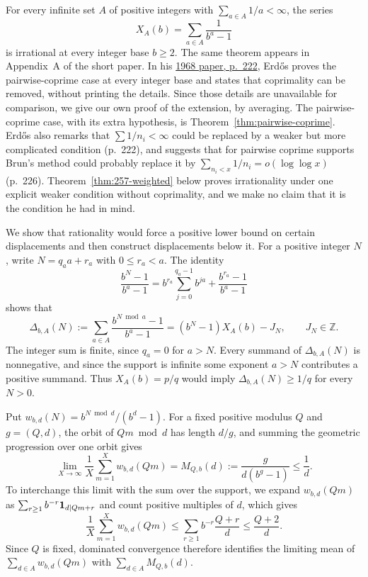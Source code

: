 For every infinite set $A$ of positive integers with
$\sum_{a\in A}1/a<\infty$, the series
\[
 X_A(b)=\sum_{a\in A}\frac1{b^a-1}
\]
is irrational at every integer base $b\ge2$. The same theorem appears
in Appendix~A of the short paper. In his
\href{https://users.renyi.hu/~p_erdos/1969-09.pdf}{1968 paper, p.~222},
Erd\H{o}s proves the pairwise-coprime case at every integer base and
states that coprimality can be removed, without printing the details.
Since those details are unavailable for comparison, we give our own
proof of the extension, by averaging. The pairwise-coprime case, with
its extra hypothesis, is Theorem~\ref{thm:pairwise-coprime}. Erd\H{o}s
also remarks that $\sum1/n_i<\infty$ could be replaced by a weaker but more
complicated condition (p.~222), and suggests that for pairwise coprime
supports Brun's method could probably replace it by
$\sum_{n_i<x}1/n_i=o(\log\log x)$ (p.~226).
Theorem~\ref{thm:257-weighted} below proves irrationality under one explicit
weaker condition without coprimality, and we make no claim that it is the
condition he had in mind.

We show that rationality would force a positive lower bound on certain
displacements and then construct displacements below it. For a positive
integer $N$, write $N=q_a a+r_a$ with $0\le r_a<a$. The identity
\[
 \frac{b^N-1}{b^a-1}
 =b^{r_a}\sum_{j=0}^{q_a-1}b^{ja}
  +\frac{b^{r_a}-1}{b^a-1}
\]
shows that
\[
 \Delta_{b,A}(N):=\sum_{a\in A}\frac{b^{N\bmod a}-1}{b^a-1}
 =(b^N-1)X_A(b)-J_N,\qquad J_N\in\mathbb Z.
\]
The integer sum is finite, since $q_a=0$ for $a>N$. Every summand of
$\Delta_{b,A}(N)$ is nonnegative, and since the support is infinite some
exponent $a>N$ contributes a positive summand.
Thus $X_A(b)=p/q$ would imply $\Delta_{b,A}(N)\ge1/q$ for every $N>0$.

Put $w_{b,d}(N)=b^{N\bmod d}/(b^d-1)$. For a fixed positive modulus $Q$
and $g=(Q,d)$, the orbit of $Qm\bmod d$ has length $d/g$, and summing the
geometric progression over one orbit gives
\[
 \lim_{X\to\infty}\frac1X\sum_{m=1}^Xw_{b,d}(Qm)
 =M_{Q,b}(d):=\frac{g}{d(b^g-1)}\le\frac1d.
\]
To interchange this limit with the sum over the support, we expand
$w_{b,d}(Qm)$ as $\sum_{r\ge1}b^{-r}{\bf1}_{d\mid Qm+r}$ and count
positive multiples of $d$, which gives
\[
 \frac1X\sum_{m=1}^Xw_{b,d}(Qm)
 \le\sum_{r\ge1}b^{-r}\frac{Q+r}{d}
 \le\frac{Q+2}{d}.
\]
Since $Q$ is fixed, dominated convergence therefore identifies the limiting mean of $\sum_{d\in A}w_{b,d}(Qm)$ with $\sum_{d\in A}M_{Q,b}(d)$.

